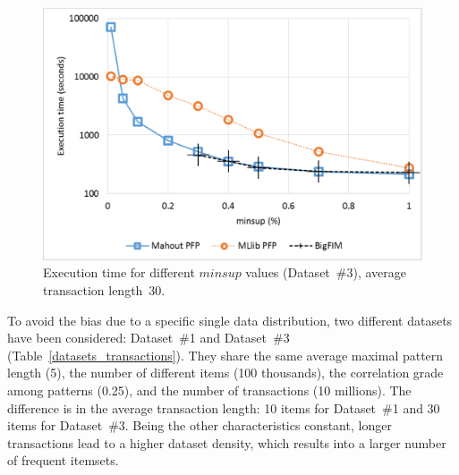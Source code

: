 \documentclass[preprint,review,12pt]{elsarticle}
\begin{document}


\begin{figure}[!t]
\includegraphics[width=5in]{minsup_3_log.eps}
\caption{Execution time for different $minsup$ values
(Dataset~\#3), average transaction length~30.}
\label{minsup_3}
\end{figure}



To avoid the bias due to a specific single data distribution,
two different datasets have been considered:
Dataset~\#1 and Dataset~\#3 (Table~\ref{datasets_transactions}).
They share the same average maximal pattern length (5),
the number of different items (100 thousands),
the correlation grade among patterns (0.25), and
the number of transactions (10 millions).
The difference is in the average transaction length:
10 items for Dataset~\#1 and 30 items for Dataset~\#3.
Being the other characteristics constant,
longer transactions lead to a higher dataset density,
which results into a larger number of frequent itemsets.
\end{document}
